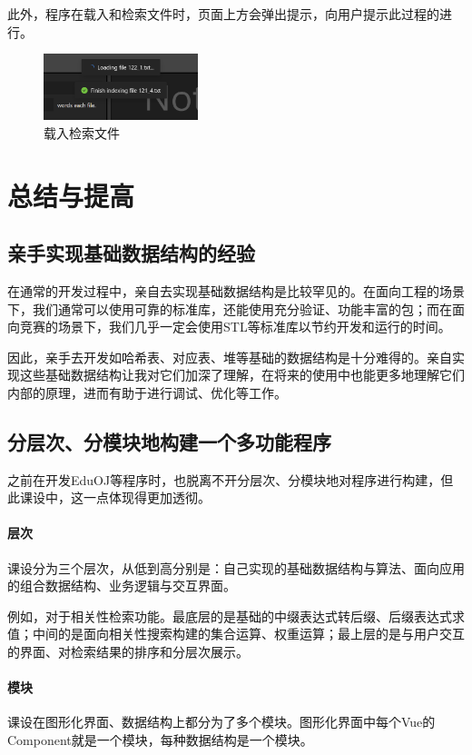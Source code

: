 \documentclass[scheme = chinese]{ctexart}
\begin{document}
此外，程序在载入和检索文件时，页面上方会弹出提示，向用户提示此过程的进行。

\begin{figure}[h]
    \centering
    \includegraphics[width=0.4\textwidth]{images/测试-载入检索文件.png}
    \caption{载入检索文件}
\end{figure}

\clearpage

\section{总结与提高}

\subsection{亲手实现基础数据结构的经验}
在通常的开发过程中，亲自去实现基础数据结构是比较罕见的。在面向工程的场景下，我们通常可以使用可靠的标准库，还能使用充分验证、功能丰富的包；而在面向竞赛的场景下，我们几乎一定会使用STL等标准库以节约开发和运行的时间。

因此，亲手去开发如哈希表、对应表、堆等基础的数据结构是十分难得的。亲自实现这些基础数据结构让我对它们加深了理解，在将来的使用中也能更多地理解它们内部的原理，进而有助于进行调试、优化等工作。

\subsection{分层次、分模块地构建一个多功能程序}
之前在开发EduOJ等程序时，也脱离不开分层次、分模块地对程序进行构建，但此课设中，这一点体现得更加透彻。

\paragraph{层次} 课设分为三个层次，从低到高分别是：自己实现的基础数据结构与算法、面向应用的组合数据结构、业务逻辑与交互界面。

例如，对于相关性检索功能。最底层的是基础的中缀表达式转后缀、后缀表达式求值；中间的是面向相关性搜索构建的集合运算、权重运算；最上层的是与用户交互的界面、对检索结果的排序和分层次展示。

\paragraph{模块} 课设在图形化界面、数据结构上都分为了多个模块。图形化界面中每个Vue的Component就是一个模块，每种数据结构是一个模块。
\end{document}
